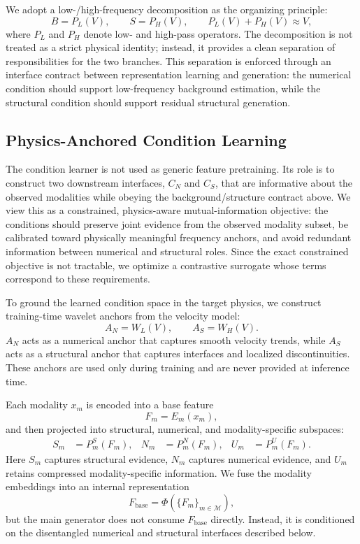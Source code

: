 \documentclass[letterpaper]{article}
\begin{document}
We adopt a low-/high-frequency decomposition as the organizing principle:
\begin{equation}
B=P_L(V),\qquad S=P_H(V),\qquad P_L(V)+P_H(V)\approx V,
\end{equation}
where $P_L$ and $P_H$ denote low- and high-pass operators. The decomposition is not treated as a strict physical identity; instead, it provides a clean separation of responsibilities for the two branches.
This separation is enforced through an interface contract between representation learning and generation: the numerical condition should support low-frequency background estimation, while the structural condition should support residual structural generation.

\subsection{Physics-Anchored Condition Learning}
The condition learner is not used as generic feature pretraining. Its role is to construct two downstream interfaces, $C_N$ and $C_S$, that are informative about the observed modalities while obeying the background/structure contract above. We view this as a constrained, physics-aware mutual-information objective: the conditions should preserve joint evidence from the observed modality subset, be calibrated toward physically meaningful frequency anchors, and avoid redundant information between numerical and structural roles. Since the exact constrained objective is not tractable, we optimize a contrastive surrogate whose terms correspond to these requirements.

To ground the learned condition space in the target physics, we construct training-time wavelet anchors from the velocity model:
\begin{equation}
A_N=W_L(V),\qquad A_S=W_H(V).
\end{equation}
$A_N$ acts as a numerical anchor that captures smooth velocity trends, while $A_S$ acts as a structural anchor that captures interfaces and localized discontinuities. These anchors are used only during training and are never provided at inference time.

Each modality $x_m$ is encoded into a base feature
\begin{equation}
F_m=E_m(x_m),
\end{equation}
and then projected into structural, numerical, and modality-specific subspaces:
\begin{align}
S_m&=P_m^S(F_m),&
N_m&=P_m^N(F_m),&
U_m&=P_m^U(F_m).
\end{align}
Here $S_m$ captures structural evidence, $N_m$ captures numerical evidence, and $U_m$ retains compressed modality-specific information. We fuse the modality embeddings into an internal representation
\begin{equation}
F_{\mathrm{base}}=\Phi(\{F_m\}_{m\in\mathcal M}),
\end{equation}
but the main generator does not consume $F_{\mathrm{base}}$ directly. Instead, it is conditioned on the disentangled numerical and structural interfaces described below.
\end{document}
